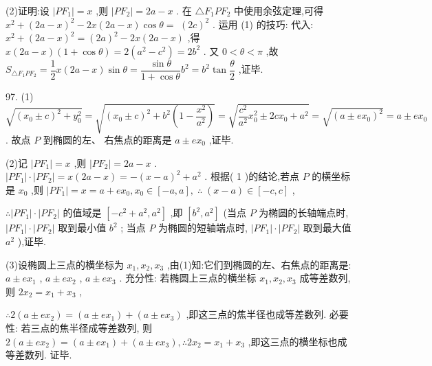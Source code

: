 (2)证明:设 $\left| {P{F}_{1}}\right|  = x$ ,则 $\left| {P{F}_{2}}\right|  = {2a} - x$ . 在 $\bigtriangleup {F}_{1}P{F}_{2}$ 中使用余弦定理,可得 ${x}^{2} + {\left( 2a - x\right) }^{2} - {2x}\left( {{2a} - x}\right) \cos \theta  =$  ${\left( 2c\right) }^{2}$ . 运用 (1) 的技巧: 代入: ${x}^{2} + {\left( 2a - x\right) }^{2} = {\left( 2a\right) }^{2} - {2x}\left( {{2a} - x}\right)$ ,得 $x\left( {{2a} - x}\right) \left( {1 + \cos \theta }\right)  = 2\left( {{a}^{2} - {c}^{2}}\right)  = 2{b}^{2}$ . 又 $0 < \theta  < \pi$ ,故 ${S}_{\bigtriangleup {F}_{1}P{F}_{2}} = \dfrac{1}{2}x\left( {{2a} - x}\right) \sin \theta  = \dfrac{\sin \theta }{1 + \cos \theta }{b}^{2} = {b}^{2}\tan \dfrac{\theta }{2}$ ,证毕.

97. (1) $\sqrt{{\left( {x}_{0} \pm  c\right) }^{2} + {y}_{0}^{2}} = \sqrt{{\left( {x}_{0} \pm  c\right) }^{2} + {b}^{2}\left( {1 - \dfrac{{x}^{2}}{{a}^{2}}}\right) } = \sqrt{\dfrac{{c}^{2}}{{a}^{2}}{x}_{0}^{2} \pm  {2c}{x}_{0} + {a}^{2}} = \sqrt{{\left( a \pm  e{x}_{0}\right) }^{2}} = a \pm  e{x}_{0}$ . 故点 $P$ 到椭圆的左、 右焦点的距离是 $a \pm  e{x}_{0}$ ,证毕.

(2)记 $\left| {P{F}_{1}}\right|  = x$ ,则 $\left| {P{F}_{2}}\right|  = {2a} - x$ . $\left| {P{F}_{1}}\right|  \cdot  \left| {P{F}_{2}}\right|  = x\left( {{2a} - x}\right)  =  - {\left( x - a\right) }^{2} + {a}^{2}$ . 根据( 1 )的结论,若点 $P$ 的横坐标是 ${x}_{0}$ ,则 $\left| {P{F}_{1}}\right|  = x = a + e{x}_{0},{x}_{0} \in  \left\lbrack  {-a,a}\right\rbrack  ,\;\therefore \;\left( {x - a}\right)  \in  \left\lbrack  {-c,c}\right\rbrack$ ,

$\therefore \left| {P{F}_{1}}\right|  \cdot  \left| {P{F}_{2}}\right|$ 的值域是 $\left\lbrack  {-{c}^{2} + {a}^{2},{a}^{2}}\right\rbrack$ ,即 $\left\lbrack  {{b}^{2},{a}^{2}}\right\rbrack$ (当点 $P$ 为椭圆的长轴端点时, $\left| {P{F}_{1}}\right|  \cdot  \left| {P{F}_{2}}\right|$ 取到最小值 ${b}^{2}$ ; 当点 $P$ 为椭圆的短轴端点时, $\left| {P{F}_{1}}\right|  \cdot  \left| {P{F}_{2}}\right|$ 取到最大值 ${a}^{2}$ ),证毕.

(3)设椭圆上三点的横坐标为 ${x}_{1},{x}_{2},{x}_{3}$ ,由(1)知:它们到椭圆的左、右焦点的距离是: $a \pm  e{x}_{1}$ , $a \pm  e{x}_{2}$ , $a \pm  e{x}_{3}$ . 充分性: 若椭圆上三点的横坐标 ${x}_{1},{x}_{2},{x}_{3}$ 成等差数列,则 $2{x}_{2} = {x}_{1} + {x}_{3}$ ,

$\therefore 2\left( {a \pm  e{x}_{2}}\right)  = \left( {a \pm  e{x}_{1}}\right)  + \left( {a \pm  e{x}_{3}}\right)$ ,即这三点的焦半径也成等差数列. 必要性: 若三点的焦半径成等差数列, 则 $2\left( {a \pm  e{x}_{2}}\right)  = \left( {a \pm  e{x}_{1}}\right)  + \left( {a \pm  e{x}_{3}}\right) ,\therefore 2{x}_{2} = {x}_{1} + {x}_{3}$ ,即这三点的横坐标也成等差数列. 证毕.

